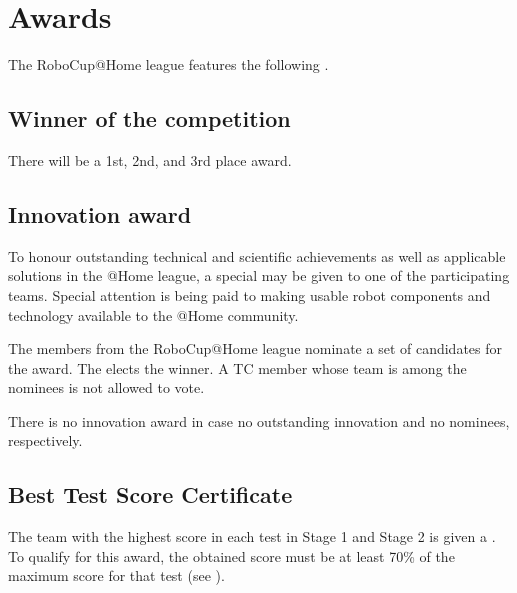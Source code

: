 \section{Awards}
The RoboCup@Home league features the following .

\subsection{Winner of the competition}
There will be a 1st, 2nd, and 3rd place award.

\subsection{Innovation award}
To honour outstanding technical and scientific achievements as well as applicable solutions in the @Home league, a special  may be given to one of the participating teams. Special attention is being paid to making usable robot components and technology available to the @Home community.

The  members from the RoboCup@Home league nominate a set of candidates for the award. The  elects the winner. A TC member whose team is among the nominees is not allowed to vote.

There is no innovation award in case no outstanding innovation and no nominees, respectively.

%

\subsection{Best Test Score Certificate}
The team with the highest score in each test in Stage 1 and Stage 2 is given a . To qualify for this award, the obtained score must be at least 70\% of the maximum score for that test (see ).

